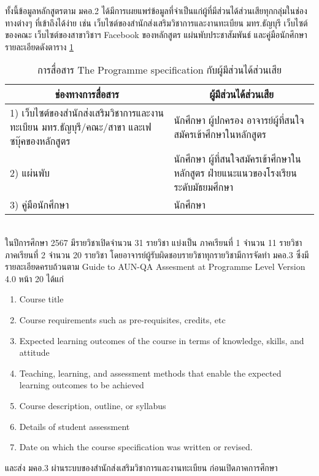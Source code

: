ทั้งนี้ข้อมูลหลักสูตรตาม มคอ.2 ได้มีการเผยแพร่ข้อมูลที่จำเป็นแก่ผู้ที่มีส่วนได้ส่วนเสียทุกกลุ่มในช่องทางต่างๆ ที่เข้าถึงได้ง่าย เช่น เว็บไซต์ของสำนักส่งเสริมวิชาการและงานทะเบียน มทร.ธัญบุรี
เว็บไซต์ของคณะ เว็บไซต์ของสาขาวิชาฯ Facebook ของหลักสูตร แผ่นพับประชาสัมพันธ์ และคู่มือนักศึกษา\printprogram{} รายละเอียดดังตาราง \ref{Table:M2-13}
\newpage
\begin{longtable}{|p{}|p{}|}
	\caption{การสื่อสาร The Programme specification กับผู้มีส่วนได้ส่วนเสีย}
	\label{Table:M2-13}
\\
\hline
\multicolumn{1}{|c|}{\bf ช่องทางการสื่อสาร}&\multicolumn{1}{c|}{\bf ผู้มีส่วนได้ส่วนเสีย}\\
\hline
\endhead
1) เว็บไซต์ของสำนักส่งเสริมวิชาการและงานทะเบียน มทร.ธัญบุรี\newline/คณะ/สาขา และเฟซบุ๊คของหลักสูตร& นักศึกษา ผู้ปกครอง อาจารย์\newline ผู้ที่สนใจสมัครเข้าศึกษาในหลักสูตร\\\hline
2) แผ่นพับ& นักศึกษา\newline 
ผู้ที่สนใจสมัครเข้าศึกษาในหลักสูตร\newline 
ฝ่ายแนะแนวของโรงเรียนระดับมัธยมศึกษา
\\\hline
3) คู่มือนักศึกษา& นักศึกษา\\\hline
\end{longtable}	
\\
ในปีการศึกษา 2567 มีรายวิชาเปิดจำนวน 31  รายวิชา แบ่งเป็น
ภาคเรียนที่ 1 จำนวน 11 รายวิชา ภาคเรียนที่ 2 จำนวน 20 รายวิชา โดยอาจารย์ผู้รับผิดชอบรายวิชาทุกรายวิชามีการจัดทำ มคอ.3 ซึ่งมีรายละเอียดครบถ้วนตาม Guide to
AUN-QA Assesment at Programme Level Version 4.0 หน้า 20 ได้แก่
\begin{enumerate}
	\item Course title
	\item Course requirements such as pre-requisites, credits, etc
	\item Expected learning outcomes of the course in terms of knowledge, skills, and
	attitude
	\item Teaching, learning, and assessment methods that enable the expected learning outcomes to be achieved
	\item Course description, outline, or syllabus
	\item Details of student assessment
	\item Date on which the course specification was written or revised.
\end{enumerate}
และส่ง มคอ.3 ผ่านระบบของสำนักส่งเสริมวิชาการและงานทะเบียน ก่อนเปิดภาคการศึกษา

